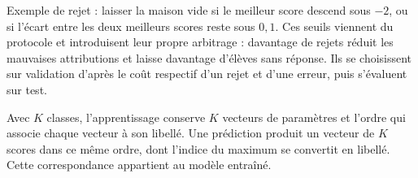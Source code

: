 Exemple de rejet : laisser la maison vide si le meilleur score descend sous $-2$,
ou si l'écart entre les deux meilleurs scores reste sous $0{,}1$. Ces seuils
viennent du protocole et introduisent leur propre arbitrage : davantage de rejets
réduit les mauvaises attributions et laisse davantage d'élèves sans réponse. Ils
se choisissent sur validation d'après le coût respectif d'un rejet et d'une
erreur, puis s'évaluent sur test.

\begin{resultat}
Avec $K$ classes, l'apprentissage conserve $K$ vecteurs de paramètres et l'ordre
qui associe chaque vecteur à son libellé. Une prédiction produit un vecteur de
$K$ scores dans ce même ordre, dont l'indice du maximum se convertit en libellé.
Cette correspondance appartient au modèle entraîné.
\end{resultat}
